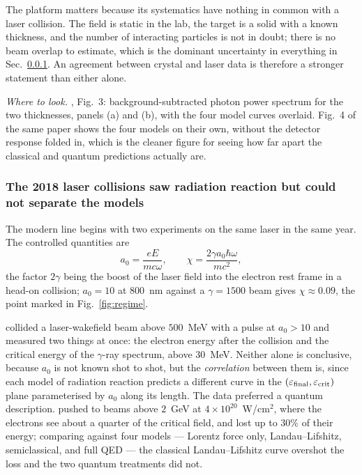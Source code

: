 \documentclass[preprint]{aastex701}
\begin{document}
The platform matters because its systematics have nothing in common with a
laser collision. The field is static in the lab, the target is a solid with a
known thickness, and the number of interacting particles is not in doubt; there
is no beam overlap to estimate, which is the dominant uncertainty in everything
in Sec.~\ref{sec:laser2018}. An agreement between crystal and laser data is
therefore a stronger statement than either alone.

\emph{Where to look.} \citet{wistisen2018}, Fig.~3: background-subtracted
photon power spectrum for the two thicknesses, panels (a) and (b), with the
four model curves overlaid. Fig.~4 of the same paper shows the four models on
their own, without the detector response folded in, which is the cleaner figure
for seeing how far apart the classical and quantum predictions actually are.

\subsubsection{The 2018 laser collisions saw radiation reaction but could not
separate the models}
\label{sec:laser2018}

The modern line begins with two experiments on the same laser in the same year.
The controlled quantities are
\begin{equation}
a_0 = \frac{eE}{mc\omega},
\qquad
\chi = \frac{2\gamma a_0\hbar\omega}{mc^2},
\label{eq:a0chi}
\end{equation}
the factor $2\gamma$ being the boost of the laser field into the electron rest
frame in a head-on collision; $a_0=10$ at $800$~nm against a $\gamma=1500$ beam
gives $\chi\approx0.09$, the point marked in Fig.~\ref{fig:regime}.

\citet{cole2018} collided a laser-wakefield beam above $500$~MeV with a pulse
at $a_0>10$ and measured two things at once: the electron energy after the
collision and the critical energy of the $\gamma$-ray spectrum, above $30$~MeV.
Neither alone is conclusive, because $a_0$ is not known shot to shot, but the
\emph{correlation} between them is, since each model of radiation reaction
predicts a different curve in the $(\varepsilon_{\rm final},
\varepsilon_{\rm crit})$ plane parameterised by $a_0$ along its length. The
data preferred a quantum description. \citet{poder2018} pushed to beams above
$2$~GeV at $4\times10^{20}$~W/cm$^2$, where the electrons see about a quarter
of the critical field, and lost up to $30\%$ of their energy; comparing against
four models --- Lorentz force only, Landau--Lifshitz, semiclassical, and full
QED --- the classical Landau--Lifshitz curve overshot the loss and the two
quantum treatments did not.
\end{document}
